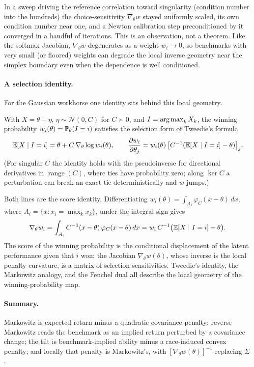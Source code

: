 In a sweep driving the reference correlation
toward singularity (condition number into the hundreds) the choice-sensitivity
$\nabla_\theta w$ stayed uniformly scaled, its own condition number near one, and a
Newton calibration step preconditioned by it converged in a handful of iterations.
This is an observation, not a theorem.
Like the softmax Jacobian, $\nabla_\theta w$ degenerates as a weight $w_i \to 0$, so
benchmarks with very small (or floored) weights can degrade the local inverse
geometry near the simplex boundary even when the dependence is well conditioned.

\paragraph{A selection identity.}
For the Gaussian workhorse one identity sits behind this local geometry.
\begin{lemma}
\label{lem:tweedie}
With $X = \theta + \eta$, $\eta\sim\mathcal N(0,C)$ for $C\succ0$, and
$I = \operatorname*{arg\,max}_k X_k$, the winning probability $w_i(\theta) = \mathbb{P}_\theta(I=i)$
satisfies the selection form of Tweedie's formula \parencite{efron2011}
\begin{equation*}
  \mathbb{E}[X \mid I=i] = \theta + C\,\nabla_\theta\log w_i(\theta), \qquad
  \frac{\partial w_i}{\partial\theta_j}
  = w_i(\theta)\,\big[C^{-1}(\mathbb{E}[X\mid I=i] - \theta)\big]_j.
\end{equation*}
(For singular $C$ the identity holds with the pseudoinverse for directional
derivatives in $\operatorname{range}(C)$, where ties have probability zero; along
$\ker C$ a perturbation can break an exact tie deterministically and $w$ jumps.)
\end{lemma}
Both lines are the score identity. Differentiating
$w_i(\theta) = \int_{A_i} \varphi_C(x - \theta)\,dx$, where
$A_i = \{x : x_i = \max_k x_k\}$, under the integral sign gives
\[
  \nabla_\theta w_i = \int_{A_i}
  C^{-1}(x - \theta)\,\varphi_C(x - \theta)\,dx
  = w_i\, C^{-1}\big(\mathbb{E}[X \mid I = i] - \theta\big).
\]
The score of the winning probability is the conditional displacement of the latent
performance given that $i$ won; the Jacobian $\nabla_\theta w(\theta)$, whose
inverse is the local penalty curvature, is a matrix of selection sensitivities.
Tweedie's identity, the Markowitz analogy, and the Fenchel dual all describe the
local geometry of the winning-probability map.

\paragraph{Summary.}
Markowitz is expected return minus a quadratic covariance penalty; reverse
Markowitz reads the benchmark as an implied return perturbed by a covariance
change; the tilt is benchmark-implied ability minus a race-induced convex penalty;
and locally that penalty is Markowitz's, with $[\nabla_\theta w(\theta)]^{-1}$
replacing $\Sigma$.

